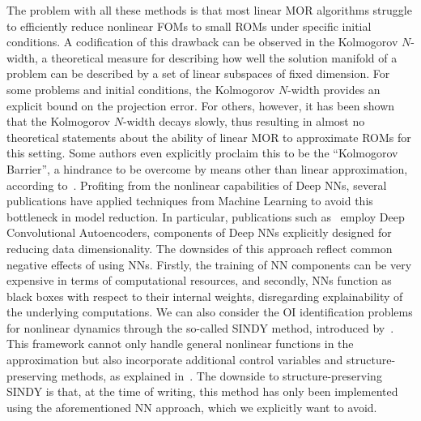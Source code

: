 The problem with all these methods is that most linear MOR algorithms struggle to efficiently reduce nonlinear \acp{FOM} to small \acp{ROM} under specific initial conditions.
A codification of this drawback can be observed in the Kolmogorov $N$-width, a theoretical measure for describing how well the solution manifold of a problem can be described by a set of linear subspaces of fixed dimension.
For some problems and initial conditions, the Kolmogorov $N$-width provides an explicit bound on the projection error.
For others, however, it has been shown that the Kolmogorov $N$-width decays slowly, thus resulting in almost no theoretical statements about the ability of linear \ac{MOR} to approximate \acp{ROM} for this setting.
Some authors even explicitly proclaim this to be the ``Kolmogorov Barrier'', a hindrance to be overcome by means other than linear approximation, according to~\cite{Barnett2022}.
Profiting from the nonlinear capabilities of Deep \acfp{NN}, several publications have applied techniques from Machine Learning to avoid this bottleneck in model reduction.
In particular, publications such as~\cite{Lee2020, Benner2022, Romor2023, Buchfink2023} employ Deep Convolutional Autoencoders, components of Deep \acp{NN} explicitly designed for reducing data dimensionality.
The downsides of this approach reflect common negative effects of using \acp{NN}.
Firstly, the training of \ac{NN} components can be very expensive in terms of computational resources, and secondly, \acp{NN} function as black boxes with respect to their internal weights, disregarding explainability of the underlying computations.
We can also consider the \ac{OI} identification problems for nonlinear dynamics through the so-called \acs{SINDY} method, introduced by~\cite{Brunton2016, Kaheman2020}.
This framework cannot only handle general nonlinear functions in the approximation but also incorporate additional control variables and structure-preserving methods, as explained in~\cite{Kaiser2018, Lee2022}.
The downside to structure-preserving \acs{SINDY} is that, at the time of writing, this method has only been implemented using the aforementioned \ac{NN} approach, which we explicitly want to avoid.

